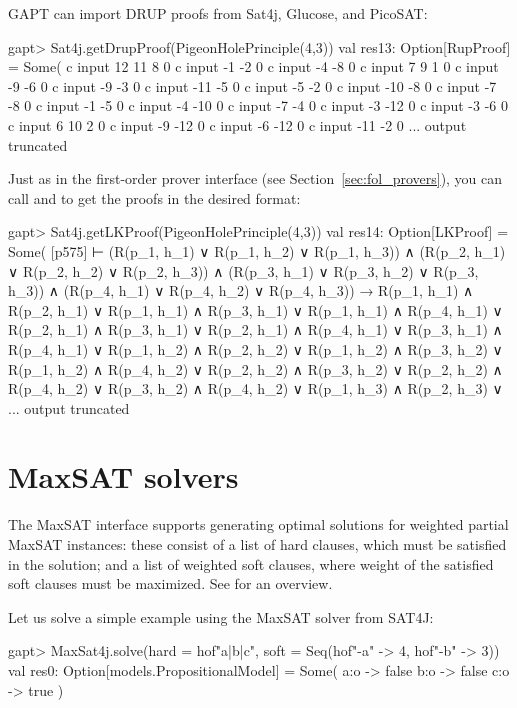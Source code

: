 \documentclass[a4paper,11pt]{book}
\newcommand{\cli}[1]{{\ttfamily {#1}}}
\begin{document}
GAPT can import DRUP proofs from Sat4j, Glucose, and PicoSAT:
\begin{clilisting}
gapt> Sat4j.getDrupProof(PigeonHolePrinciple(4,3))
val res13: Option[RupProof] = Some(
  c input 12 11 8 0
c input -1 -2 0
c input -4 -8 0
c input 7 9 1 0
c input -9 -6 0
c input -9 -3 0
c input -11 -5 0
c input -5 -2 0
c input -10 -8 0
c input -7 -8 0
c input -1 -5 0
c input -4 -10 0
c input -7 -4 0
c input -3 -12 0
c input -3 -6 0
c input 6 10 2 0
c input -9 -12 0
c input -6 -12 0
c input -11 -2 0
... output truncated

\end{clilisting}

Just as in the first-order prover interface (see Section~\ref{sec:fol_provers}), you can call
\cli{getResolutionProof} and \cli{getLKProof} to get the proofs in the desired
format:
\begin{clilisting}
gapt> Sat4j.getLKProof(PigeonHolePrinciple(4,3))
val res14: Option[LKProof] = Some(
  [p575] 
⊢
(R(p_1, h_1) ∨ R(p_1, h_2) ∨ R(p_1, h_3)) ∧
    (R(p_2, h_1) ∨ R(p_2, h_2) ∨ R(p_2, h_3)) ∧
    (R(p_3, h_1) ∨ R(p_3, h_2) ∨ R(p_3, h_3)) ∧
    (R(p_4, h_1) ∨ R(p_4, h_2) ∨ R(p_4, h_3)) →
  R(p_1, h_1) ∧ R(p_2, h_1) ∨
    R(p_1, h_1) ∧ R(p_3, h_1) ∨
    R(p_1, h_1) ∧ R(p_4, h_1) ∨
    R(p_2, h_1) ∧ R(p_3, h_1) ∨
    R(p_2, h_1) ∧ R(p_4, h_1) ∨
    R(p_3, h_1) ∧ R(p_4, h_1) ∨
    R(p_1, h_2) ∧ R(p_2, h_2) ∨
    R(p_1, h_2) ∧ R(p_3, h_2) ∨
    R(p_1, h_2) ∧ R(p_4, h_2) ∨
    R(p_2, h_2) ∧ R(p_3, h_2) ∨
    R(p_2, h_2) ∧ R(p_4, h_2) ∨
    R(p_3, h_2) ∧ R(p_4, h_2) ∨
    R(p_1, h_3) ∧ R(p_2, h_3) ∨
... output truncated

\end{clilisting}

\section{MaxSAT solvers}

The MaxSAT interface supports generating optimal solutions for weighted partial
MaxSAT instances: these consist of a list of hard clauses, which must be
satisfied in the solution; and a list of weighted soft clauses, where weight of
the satisfied soft clauses must be maximized.  See \cite{Argelich2008First}
for an overview.

Let us solve a simple example using the MaxSAT solver from SAT4J:

\begin{clilisting}
gapt> MaxSat4j.solve(hard = hof"a|b|c", soft = Seq(hof"-a" -> 4, hof"-b" -> 3))
val res0: Option[models.PropositionalModel] = Some(
  a:o -> false
b:o -> false
c:o -> true
)

\end{clilisting}
\end{document}
